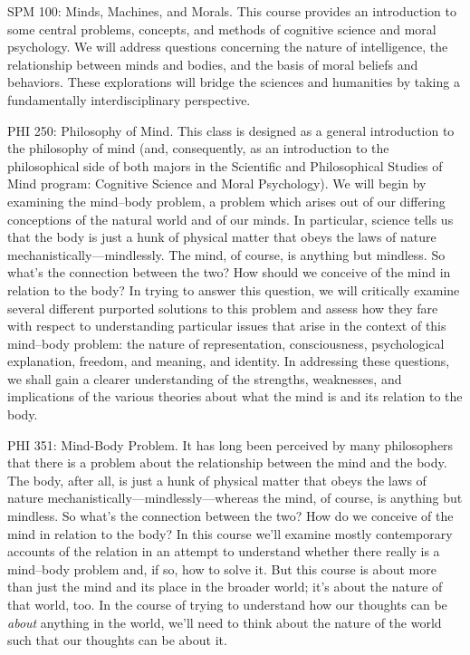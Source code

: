\documentclass[%
  11pt,%
]{article}
\begin{document}
\begin{htmlcourse}{SPM 100: Minds, Machines, and Morals.}
  This course provides an introduction to some central problems, concepts, and methods of cognitive science and moral psychology. We will address questions concerning the nature of intelligence, the relationship between minds and bodies, and the basis of moral beliefs and behaviors. These explorations will bridge the sciences and humanities by taking a fundamentally interdisciplinary perspective.
\end{htmlcourse}

\begin{htmlcourse}{PHI 250: Philosophy of Mind.}
  This class is designed as a general introduction to the philosophy of mind (and, consequently, as an introduction to the philosophical side of both majors in the Scientific and Philosophical Studies of Mind program: Cognitive Science and Moral Psychology). We will begin by examining the mind--body problem, a problem which arises out of our differing conceptions of the natural world and of our minds. In particular, science tells us that the body is just a hunk of physical matter that obeys the laws of nature mechanistically---mindlessly. The mind, of course, is anything but mindless. So what's the connection between the two? How should we conceive of the mind in relation to the body? In trying to answer this question, we will critically examine several different purported solutions to this problem and assess how they fare with respect to understanding particular issues that arise in the context of this mind--body problem: the nature of representation, consciousness, psychological explanation, freedom, and meaning, and identity. In addressing these questions, we shall gain a clearer understanding of the strengths, weaknesses, and implications of the various theories about what the mind is and its relation to the body.
\end{htmlcourse}

\begin{htmlcourse}{PHI 351: Mind-Body Problem.}
  It has long been perceived by many philosophers that there is a problem about the relationship between the mind and the body. The body, after all, is just a hunk of physical matter that obeys the laws of nature mechanistically---mindlessly---whereas the mind, of course, is anything but mindless. So what's the connection between the two? How do we conceive of the mind in relation to the body? In this course we'll examine mostly contemporary accounts of the relation in an attempt to understand whether there really is a mind--body problem and, if so, how to solve it. But this course is about more than just the mind and its place in the broader world; it's about the nature of that world, too. In the course of trying to understand how our thoughts can be \emph{about} anything in the world, we'll need to think about the nature of the world such that our thoughts can be about it.
\end{htmlcourse}
\end{document}
